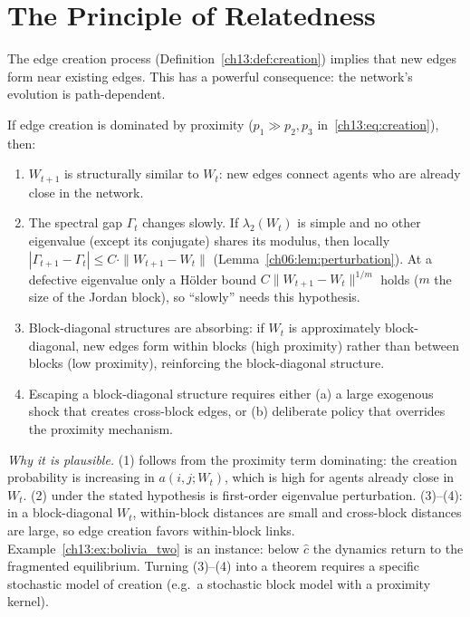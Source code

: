 \documentclass[../structural_economics_book.tex]{subfiles}
\begin{document}
\section{The Principle of Relatedness}
\label{ch13:sec:relatedness}

The edge creation process (Definition~\ref{ch13:def:creation}) implies that new edges form near existing edges. This has a powerful consequence: the network's evolution is path-dependent.

\begin{conjecture}\label{ch13:thm:path_dependence}
If edge creation is dominated by proximity ($p_1 \gg p_2, p_3$ in~\eqref{ch13:eq:creation}), then:
\begin{enumerate}
\item $W_{t+1}$ is structurally similar to $W_t$: new edges connect agents who are already close in the network.
\item The spectral gap $\Gamma_t$ changes slowly. If $\lambda_2(W_t)$ is simple and no other eigenvalue (except its conjugate) shares its modulus, then locally $|\Gamma_{t+1} - \Gamma_t| \leq C \cdot \|W_{t+1} - W_t\|$ (Lemma~\ref{ch06:lem:perturbation}). At a defective eigenvalue only a H\"{o}lder bound $C\|W_{t+1} - W_t\|^{1/m}$ holds ($m$ the size of the Jordan block), so ``slowly'' needs this hypothesis.
\item Block-diagonal structures are absorbing: if $W_t$ is approximately block-diagonal, new edges form within blocks (high proximity) rather than between blocks (low proximity), reinforcing the block-diagonal structure.
\item Escaping a block-diagonal structure requires either (a) a large exogenous shock that creates cross-block edges, or (b) deliberate policy that overrides the proximity mechanism.
\end{enumerate}
\end{conjecture}

\noindent\textit{Why it is plausible.} (1) follows from the proximity term dominating: the creation probability is increasing in $a(i,j;W_t)$, which is high for agents already close in $W_t$. (2) under the stated hypothesis is first-order eigenvalue perturbation. (3)--(4): in a block-diagonal $W_t$, within-block distances are small and cross-block distances are large, so edge creation favors within-block links. Example~\ref{ch13:ex:bolivia_two} is an instance: below $\hat c$ the dynamics return to the fragmented equilibrium. Turning (3)--(4) into a theorem requires a specific stochastic model of creation (e.g.\ a stochastic block model with a proximity kernel).
\end{document}
